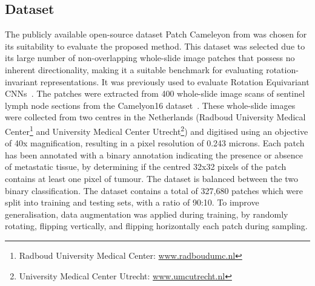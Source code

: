 \subsection{Dataset}
\label{subsec:unsupervised_dataset}
The publicly available open-source dataset Patch Cameleyon from \cite{veeling2018rotation} was chosen for its suitability to evaluate the proposed method. This dataset was selected due to its large number of non-overlapping whole-slide image patches that possess no inherent directionality, making it a suitable benchmark for evaluating rotation-invariant representations. It was previously used to evaluate Rotation Equivariant CNNs~\citep{veeling2018rotation}. The patches were extracted from 400 whole-slide image scans of sentinel lymph node sections from the Camelyon16 dataset~\citep{litjens20181399}. These whole-slide images were collected from two centres in the Netherlands (Radboud University Medical Center\footnote{Radboud University Medical Center: \url{www.radboudumc.nl}} and University Medical Center Utrecht\footnote{University Medical Center Utrecht: \url{www.umcutrecht.nl}}) and digitised using an objective of 40x magnification, resulting in a pixel resolution of 0.243 microns. Each patch has been annotated with a binary annotation indicating the presence or absence of metastatic tissue, by determining if the centred 32x32 pixels of the patch contains at least one pixel of tumour. The dataset is balanced between the two binary classification. The dataset contains a total of 327,680 patches which were split into training and testing sets, with a ratio of 90:10. To improve generalisation, data augmentation was applied during training, by randomly rotating, flipping vertically, and flipping horizontally each patch during sampling.

